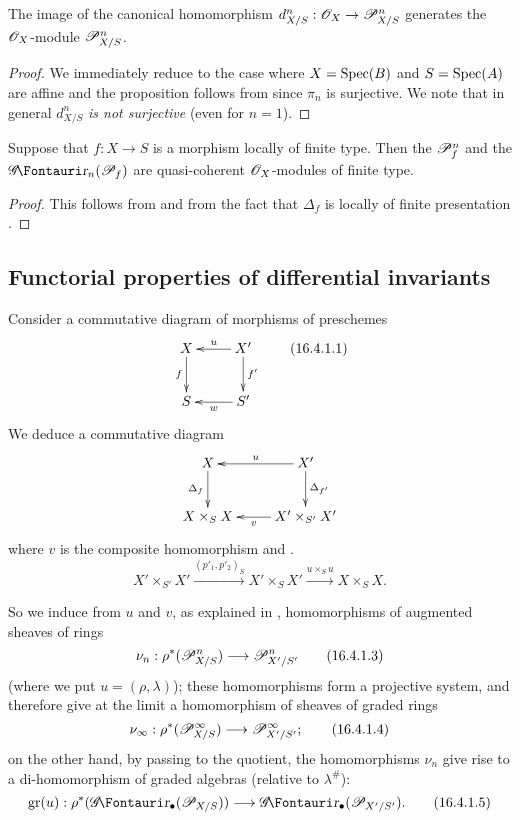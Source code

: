 \begin{proposition}[16.3.8]
\label{IV.16.3.8}
The image of the canonical homomorphism $d_{X/S}^n: \sh{O}_X \to \sh{P}_{X/S}^n$ generates the $\mathscr{O}_X$-module $\mathscr{P}_{X/S}^n$.
\end{proposition}

\begin{proof}
We immediately reduce to the case where $X = \operatorname{Spec}(B)$ and $S = \operatorname{Spec}(A)$ are affine and the proposition follows from  since $\pi_n$ is surjective.
We note that in general $d_{X/S}^n$ \emph{is not surjective} (even for $n = 1$).
\end{proof}

\begin{proposition}[16.3.9]
\label{IV.16.3.8}
Suppose that $f:X \to S$ is a morphism locally of finite type.
Then the $\mathscr{P}_{f}^n$ and the $\shGr_n(\sh{P}_{f})$ are quasi-coherent $\mathscr{O}_X$-modules of finite type.
\end{proposition}

\begin{proof}
This follows from  and from the fact that $\Delta_f$ is locally of finite presentation .
\end{proof}

\subsection{Functorial properties of differential invariants}
\label{IV.16.4}

\begin{env}[16.4.1]
\label{IV.16.4.1}
Consider a commutative diagram of morphisms of preschemes
\[
  \label{IV.16.4.1.1}
  \xymatrix{
    X \ar[d]_-{f} & X' \ar[l]_-u \ar[d]^-{f'}\\
    S & S' \ar[l]^-w
  }
  \tag{16.4.1.1}
\]
We deduce a commutative diagram
\[
  \xymatrix{
    X \ar[d]_-{\Delta_f} & X' \ar[l]_-u \ar[d]^-{\Delta_{f'}}\\
    X \times_S X & X' \times_{S'} X' \ar[l]^-v
  }
\]
where $v$ is the composite homomorphism  and .
\[
  \label{IV.16.4.1.2}
  X' \times_{S'} X' \xrightarrow{(p'_1, p'_2)_S} X' \times_{S} X' \xrightarrow{u \times_S u} X \times_S X.
  \tag{16.4.1.2}
\]

So we induce from $u$ and $v$, as explained in , homomorphisms of augmented sheaves of rings
\[
  \label{IV.16.4.1.3}
  \nu_n: \rho^*(\sh{P}_{X/S}^n) \to \sh{P}_{X'/S'}^n
  \tag{16.4.1.3}
\]
(where we put $u = (\rho,\lambda)$);
these homomorphisms form a projective system, and therefore give at the limit a homomorphism of sheaves of graded rings
\[
  \label{IV.16.4.1.4}
  \nu_\infty: \rho^*(\sh{P}_{X/S}^\infty) \to \sh{P}_{X'/S'}^\infty;
  \tag{16.4.1.4}
\]
on the other hand, by passing to the quotient, the homomorphisms $\nu_n$ give rise to a di-homomorphism of graded algebras (relative to $\lambda^\#$):
\[
  \label{IV.16.4.1.5}
  \gr(u): \rho^*(\shGr_\bullet(\sh{P}_{X/S})) \to \shGr_\bullet(\sh{P}_{X'/S'}).
  \tag{16.4.1.5}
\]
\end{env}

